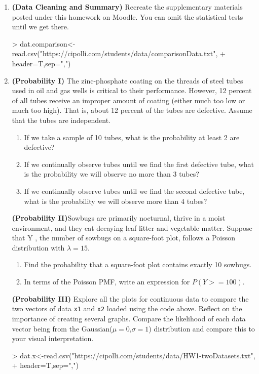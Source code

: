 \documentclass{article}
\begin{document}
\begin{enumerate}
\item \textbf{(Data Cleaning and Summary)} Recreate the supplementary materials posted under 
this homework on Moodle. You can omit the statistical tests until we get there. 
\begin{Schunk}
\begin{Sinput}
> dat.comparison<-read.csv("https://cipolli.com/students/data/comparisonData.txt",
+                          header=T,sep=",")
\end{Sinput}
\end{Schunk}
\item \textbf{(Probability I)} The zinc-phosphate coating on the threads of steel tubes used in oil and gas wells is critical to their performance. However, 12 percent of all tubes receive an improper amount of coating (either much too low or much too high). That is, about 12 percent of the tubes are defective.
Assume that the tubes are independent. 
\begin{enumerate}
  \item If we take a sample of 10 tubes, what is the probability at least 2 are defective?
  \item If we continually observe tubes until we find the first defective tube, what is the 
  probability we will observe no more than 3 tubes?
  \item If we continually observe tubes until we find the second defective tube, what is the
  probability we will observe more than 4 tubes?
\end{enumerate}

\textbf{(Probability II)}Sowbugs are primarily nocturnal, thrive in a moist environment, and they eat decaying leaf
litter and vegetable matter. Suppose that Y , the number of sowbugs on a square-foot plot,
follows a Poisson distribution with $\lambda = 15.$
\begin{enumerate}
  \item Find the probability that a square-foot plot contains exactly 10 sowbugs.
  \item In terms of the Poisson PMF, write an expression for $P(Y >= 100)$.
\end{enumerate}

\textbf{(Probability III)} Explore all the plots for continuous data to compare the 
two vectors of data \texttt{x1} and \texttt{x2} loaded using the code above. Reflect on 
the importance of creating several graphs. Compare the likelihood of each data vector
being from the Gaussian($\mu=0$,$\sigma=1$) distribution and compare this to your
visual interpretation.
\begin{Schunk}
\begin{Sinput}
> dat.x<-read.csv("https://cipolli.com/students/data/HW1-twoDatasets.txt",
+                 header=T,sep=",")
\end{Sinput}
\end{Schunk}


\end{enumerate}
\end{document}
